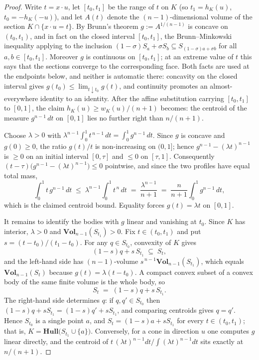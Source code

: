 \documentclass[12pt]{article}
\theoremstyle{definition}
\newcommand{\Vol}{\mathbf{Vol}}
\newcommand{\Hull}{\mathbf{Hull}}
\begin{document}
\begin{proof}
Write $t = x\cdot u$, let $[t_0,t_1]$ be the range of $t$ on $K$ (so
$t_1=h_K(u)$, $t_0=-h_K(-u)$), and let $A(t)$ denote the
$(n-1)$-dimensional volume of the section $K\cap\{x\cdot u = t\}$.  By
Brunn's theorem $g:=A^{1/(n-1)}$ is concave on $(t_0,t_1)$, and in fact on
the closed interval $[t_0,t_1]$, the Brunn--Minkowski inequality applying to
the inclusion $(1-\sigma)S_a+\sigma S_b\subseteq S_{(1-\sigma)a+\sigma b}$
for all $a,b\in[t_0,t_1]$.  Moreover $g$ is continuous on $[t_0,t_1]$; at an
extreme value of $t$ this says that the sections converge to the
corresponding face.  Both facts are used at the endpoints below, and neither
is automatic there: concavity on the closed interval gives
$g(t_0)\le\lim_{t\downarrow t_0}g(t)$, and continuity promotes an
almost-everywhere identity to an identity.  After the
affine substitution carrying $[t_0,t_1]$ to $[0,1]$, the claim
$h_K(u)\ge w_K(u)/(n+1)$ becomes: the centroid of the measure
$g^{n-1}\,dt$ on $[0,1]$ lies no further right than $n/(n+1)$.

Choose $\lambda>0$ with
$\lambda^{n-1}\int_0^1 t^{\,n-1}\,dt=\int_0^1 g^{n-1}\,dt$.  Since $g$ is
concave and $g(0)\ge 0$, the ratio $g(t)/t$ is non-increasing on
$(0,1]$; hence $g^{n-1}-(\lambda t)^{n-1}$ is $\ge 0$ on an initial
interval $[0,\tau]$ and $\le 0$ on $[\tau,1]$.  Consequently
$(t-\tau)\bigl(g^{n-1}-(\lambda t)^{n-1}\bigr)\le 0$ pointwise, and since
the two profiles have equal total mass,
\[
\int_0^1 t\,g^{n-1}\,dt \;\le\; \lambda^{n-1}\!\int_0^1 t^{\,n}\,dt
\;=\;\frac{\lambda^{n-1}}{n+1}
\;=\;\frac{n}{n+1}\int_0^1 g^{n-1}\,dt ,
\]
which is the claimed centroid bound.  Equality forces
$g(t)=\lambda t$ on $[0,1]$.

It remains to identify the bodies with $g$ linear and vanishing at
$t_0$.  Since $K$ has interior, $\lambda>0$ and $\Vol_{n-1}(S_{t_1})>0$.
Fix $t\in(t_0,t_1)$ and put $s=(t-t_0)/(t_1-t_0)$.  For any $q\in S_{t_0}$,
convexity of $K$ gives
\[
  (1-s)q + s\,S_{t_1}\;\subseteq\;S_t ,
\]
and the left-hand side has $(n-1)$-volume $s^{\,n-1}\Vol_{n-1}(S_{t_1})$,
which equals $\Vol_{n-1}(S_t)$ because $g(t)=\lambda(t-t_0)$.  A compact
convex subset of a convex body of the same finite volume is the whole body,
so
\[
  S_t\;=\;(1-s)q + s\,S_{t_1}.
\]
The right-hand side determines $q$: if $q,q'\in S_{t_0}$ then
$(1-s)q+sS_{t_1}=(1-s)q'+sS_{t_1}$, and comparing centroids gives $q=q'$.
Hence $S_{t_0}$ is a single point $a$, and $S_t=(1-s)a+sS_{t_1}$ for every
$t\in(t_0,t_1)$; that is, $K=\Hull\bigl(S_{t_1}\cup\{a\}\bigr)$.
Conversely, for a cone in direction $u$ one computes $g$ linear directly,
and the centroid of
$t\,(\lambda t)^{n-1}dt/\!\int(\lambda t)^{n-1}dt$ sits exactly at
$n/(n+1)$.
\end{proof}
\end{document}
